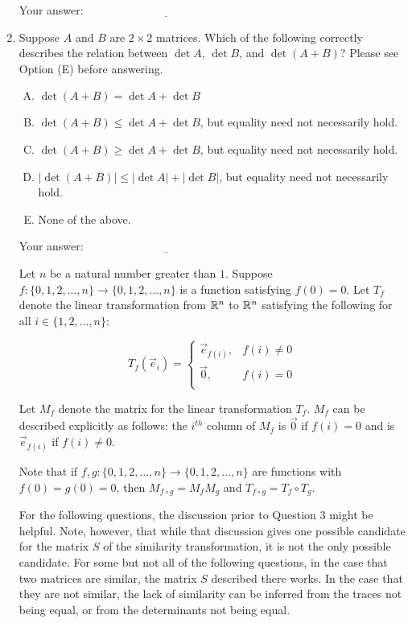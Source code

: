 \documentclass[10pt]{amsart}
\begin{document}
\begin{enumerate}
  \vspace{0.1in}
  Your answer: $\underline{\qquad\qquad\qquad\qquad\qquad\qquad\qquad}$
  \vspace{0.1in}

\item Suppose $A$ and $B$ are $2 \times 2$ matrices. Which of the
  following correctly describes the relation between $\det A$, $\det
  B$, and $\det (A + B)$? Please see Option (E) before answering.

  \begin{enumerate}[(A)]
  \item $\det(A + B) = \det A + \det B$
  \item $\det(A + B) \le \det A + \det B$, but equality need not
    necessarily hold.
  \item $\det(A + B) \ge \det A + \det B$, but equality need not
    necessarily hold.
  \item $|\det(A + B)| \le |\det A| + |\det B|$, but equality need not
    necessarily hold.
  \item None of the above.
  \end{enumerate}

  \vspace{0.1in}
  Your answer: $\underline{\qquad\qquad\qquad\qquad\qquad\qquad\qquad}$
  \vspace{0.1in}

  Let $n$ be a natural number greater than $1$. Suppose $f: \{
  0,1,2,\dots,n\} \to \{ 0,1,2,\dots,n\}$ is a function satisfying $f(0)
  = 0$. Let $T_f$ denote the linear transformation from $\mathbb{R}^n$ to $\mathbb{R}^n$
  satisfying the following for all $i \in \{ 1,2,\dots,n\}$:
  
  $$T_f(\vec{e}_i) = \left \lbrace \begin{array}{rl} \vec{e}_{f(i)}, & f(i) \ne 0\\ \vec{0}, & f(i) = 0\\\end{array}\right.$$
    
    Let $M_f$ denote the matrix for the linear transformation $T_f$. $M_f$
    can be described explicitly as follows: the $i^{th}$ column of $M_f$
    is $\vec{0}$ if $f(i) = 0$ and is $\vec{e}_{f(i)}$ if $f(i) \ne 0$.
    
    Note that if $f,g: \{ 0,1,2,\dots,n \} \to \{ 0,1,2,\dots,n\}$ are
    functions with $f(0)= g(0) = 0$, then $M_{f \circ g} = M_fM_g$ and
    $T_{f \circ g} = T_f \circ T_g$.

    For the following questions, the discussion prior to Question 3
    might be helpful. Note, however, that while that discussion gives
    one possible candidate for the matrix $S$ of the similarity
    transformation, it is not the only possible candidate. For some
    but not all of the following questions, in the case that two
    matrices are similar, the matrix $S$ described there works. In the
    case that they are not similar, the lack of similarity can be
    inferred from the traces not being equal, or from the determinants
    not being equal.
    

\end{enumerate}
\end{document}
